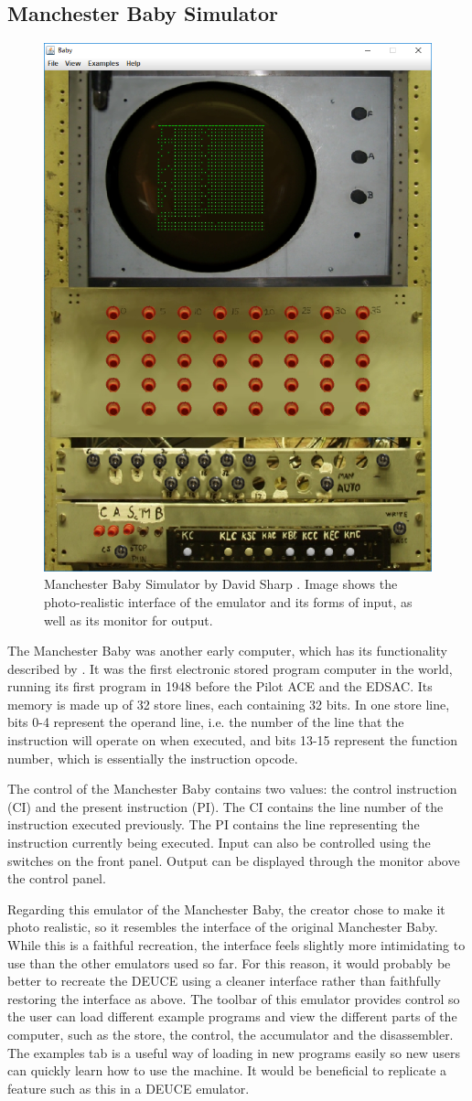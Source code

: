 \documentclass{l4proj}
\begin{document}
\subsection{Manchester Baby Simulator}
\begin{figure}[h!]
	\centering
	\includegraphics[width=0.5\linewidth]{images/baby-emu}
	\caption{Manchester Baby Simulator by David Sharp \citep{Baby08}. Image shows the photo-realistic interface of the emulator and its forms of input, as well as its monitor for output.}
	\label{fig:baby}
\end{figure}

The Manchester Baby was another early computer, which has its functionality described by \citet{BabyGuide08}. It was the first electronic stored program computer in the world, running its first program in 1948 before the Pilot ACE and the EDSAC. Its memory is made up of 32 store lines, each containing 32 bits. In one store line, bits 0-4 represent the operand line, i.e. the number of the line that the instruction will operate on when executed, and bits 13-15 represent the function number, which is essentially the instruction opcode.

The control of the Manchester Baby contains two values: the control instruction (CI) and the present instruction (PI). The CI contains the line number of the instruction executed previously. The PI contains the line representing the instruction currently being executed. Input can also be controlled using the switches on the front panel. Output can be displayed through the monitor above the control panel.

Regarding this emulator of the Manchester Baby, the creator chose to make it photo realistic, so it resembles the interface of the original Manchester Baby. While this is a faithful recreation, the interface feels slightly more intimidating to use than the other emulators used so far. For this reason, it would probably be better to recreate the DEUCE using a cleaner interface rather than faithfully restoring the interface as above.
The toolbar of this emulator provides control so the user can load different example programs and view the different parts of the computer, such as the store, the control, the accumulator and the disassembler. The examples tab is a useful way of loading in new programs easily so new users can quickly learn how to use the machine. It would be beneficial to replicate a feature such as this in a DEUCE emulator.
\end{document}
